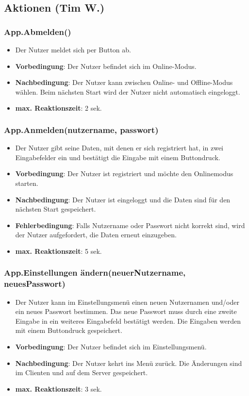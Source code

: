 \documentclass[fontsize=12pt,paper=a4,twoside]{scrartcl}
\begin{document}
\subsection{Aktionen (Tim W.)}
\subsubsection{App.Abmelden()}
\begin{itemize}
\item Der Nutzer meldet sich per Button ab.
\item \textbf{Vorbedingung}: Der Nutzer befindet sich im Online-Modus.
\item \textbf{Nachbedingung}: Der Nutzer kann zwischen Online- und Offline-Modus wählen. Beim nächsten Start wird der Nutzer nicht automatisch eingeloggt.
\item \textbf{max. Reaktionszeit}: 2 sek.
\end{itemize}

\subsubsection{App.Anmelden(nutzername, passwort)}
\begin{itemize}
\item Der Nutzer gibt seine Daten, mit denen er sich registriert hat, in zwei Eingabefelder ein und bestätigt die Eingabe mit einem Buttondruck.
\item \textbf{Vorbedingung}: Der Nutzer ist registriert und möchte den Onlinemodus starten. 
\item \textbf{Nachbedingung}: Der Nutzer ist eingeloggt und die Daten sind für den nächsten Start gespeichert.
\item \textbf{Fehlerbedingung}: Falls Nutzername oder Passwort nicht korrekt sind, wird der Nutzer aufgefordert, die Daten erneut einzugeben.
\item \textbf{max. Reaktionszeit}: 5 sek.
\end{itemize}

\subsubsection{App.Einstellungen ändern(neuerNutzername, neuesPasswort)}
\begin{itemize}
\item Der Nutzer kann im Einstellungsmenü einen neuen Nutzernamen und/oder ein neues Passwort bestimmen. Das neue Passwort muss durch eine zweite Eingabe in ein weiteres Eingabefeld bestätigt werden. Die Eingaben werden mit einem Buttondruck gespeichert.
\item \textbf{Vorbedingung}: Der Nutzer befindet sich im Einstellungsmenü.
\item \textbf{Nachbedingung}: Der Nutzer kehrt ins Menü zurück. Die Änderungen sind im Clienten und auf dem Server gespeichert.
\item \textbf{max. Reaktionszeit}: 3 sek.
\end{itemize}
\end{document}
